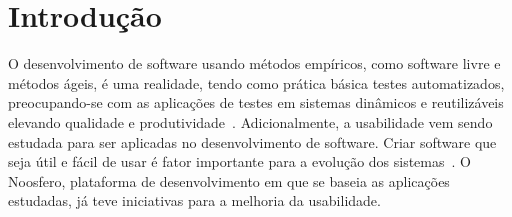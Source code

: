 \section{Introdução}
\label{introducao}

O desenvolvimento de software usando métodos empíricos, como software livre e métodos ágeis, é uma realidade, tendo como prática básica testes automatizados, preocupando-se com as aplicações de testes em sistemas dinâmicos e reutilizáveis elevando qualidade e produtividade~\cite{vicente2010}.
%
Adicionalmente, a usabilidade vem sendo estudada para ser aplicadas no desenvolvimento de software. Criar software que seja útil e fácil de usar é fator importante para a evolução dos sistemas~\cite{santos2012}.
%
O Noosfero, plataforma de desenvolvimento em que se baseia as aplicações estudadas, já teve iniciativas para a melhoria da usabilidade.
